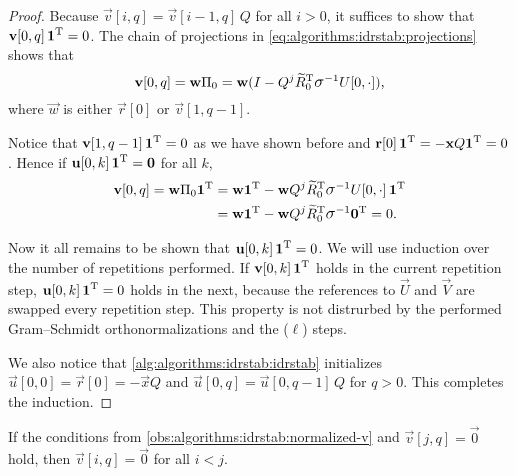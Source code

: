 \begin{proof}
  Because $\vec{v}[i, q] = \vec{v}[i - 1, q] \, Q$ for all $i > 0$, it
  suffices to show that $\bm{\mathrm{v}}[0, q] \, \bm{\mathrm{1}}^{\mathrm{T}} = 0$. The chain
  of projections in \vref{eq:algorithms:idrstab:projections} shows
  that
  \begin{equation}
    \vec{v}[0, q] = \vec{w} \Pi_0 = \vec{w} ( I - Q^{j}
    \widetilde{R}_0^\T \largesigma^{-1} U[0, \cdot] ) \text,
  \end{equation} where $\vec{w}$ is either $\vec{r}[0]$ or
  $\vec{v}[1, q - 1]$.

  Notice that $\bm{\mathrm{v}}[1, q - 1] \, \bm{\mathrm{1}}^{\mathrm{T}} = 0$ as we have shown
  before and $\bm{\mathrm{r}}[0] \, \bm{\mathrm{1}}^{\mathrm{T}} = -\bm{\mathrm{x}} Q \bm{\mathrm{1}}^{\mathrm{T}} =
  0$. Hence if $\bm{\mathrm{u}}[0, k] \, \bm{\mathrm{1}}^{\mathrm{T}} = \bm{\mathrm{0}}$ for all $k$,
  \begin{align}
    \vec{v}[0, q] = \vec{w} \Pi_0 \vec{1}^\T &= \vec{w} \vec{1}^\T - \vec{w} Q^{j}
    \widetilde{R}_0^\T \largesigma^{-1} U[0, \cdot] \, \vec{1}^\T \\
    & =\vec{w} \vec{1}^\T - \vec{w} Q^{j}
    \widetilde{R}_0^\T \largesigma^{-1} \vec{0}^\T = 0 \text.
  \end{align}

  Now it all remains to be shown that
  $\bm{\mathrm{u}}[0, k] \, \bm{\mathrm{1}}^{\mathrm{T}} = 0$. We will use induction over the
  number of repetitions performed. If $\bm{\mathrm{v}}[0, k] \, \bm{\mathrm{1}}^{\mathrm{T}}$
  holds in the current repetition step,
  $\bm{\mathrm{u}}[0, k] \, \bm{\mathrm{1}}^{\mathrm{T}} = 0$ holds in the next, because the
  references to $\vec{U}$ and $\vec{V}$ are swapped every repetition
  step. This property is not distrurbed by the performed Gram--Schmidt
  orthonormalizations and the ($\ell$) steps.

  We also notice that \vref{alg:algorithms:idrstab:idrstab}
  initializes $\vec{u}[0, 0] = \vec{r}[0] = -\vec{x} Q$ and
  $\vec{u}[0, q] = \vec{u}[0, q - 1] \, Q$ for $q > 0$. This completes
  the induction.
\end{proof}

\begin{obs}
  \label{obs:algorithms:idrstab:vanishing-v}
  If the conditions from \cref{obs:algorithms:idrstab:normalized-v}
  and $\vec{v}[j, q] = \vec{0}$ hold, then $\vec{v}[i, q] = \vec{0}$
  for all $i < j$.
\end{obs}

